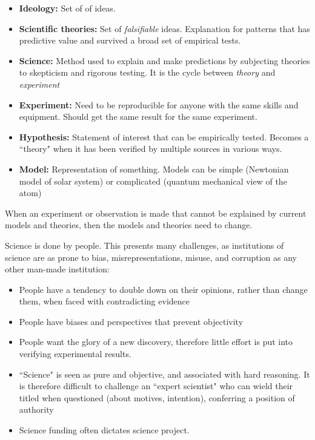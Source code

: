 \documentclass[12pt]{article}
\begin{document}
\begin{itemize}
\item \textbf{Ideology:} Set of of ideas.
\item \textbf{Scientific theories:} Set of \textit{falsifiable} ideas. Explanation for patterns that has predictive value and survived a broad set of empirical tests.
\item \textbf{Science:} Method used to explain and make predictions by subjecting theories to skepticism and rigorous testing. It is the cycle between \textit{theory} and \textit{experiment}
\item \textbf{Experiment:} Need to be reproducible for anyone with the same skills and equipment. Should get the same result for the same experiment.
\item \textbf{Hypothesis:} Statement of interest that can be empirically tested. Becomes a ``theory" when it has been verified by multiple sources in various ways.
\item \textbf{Model:} Representation of something. Models can be simple (Newtonian model of solar system) or complicated (quantum mechanical view of the atom)
\end{itemize}

When an experiment or observation is made that cannot be explained by current models and theories, then the models and theories need to change.

Science is done by people. This presents many challenges, as institutions of science are as prone to bias, misrepresentations, misuse, and corruption as any other man-made institution:
\begin{itemize}
\item People have a tendency to double down on their opinions, rather than change them, when faced with contradicting evidence
\item People have biases and perspectives that prevent objectivity
\item People want the glory of a new discovery, therefore little effort is put into verifying experimental results.
\item ``Science" is seen as pure and objective, and associated with hard reasoning. It is therefore difficult to challenge an ``expert scientist" who can wield their titled when questioned (about motives, intention), conferring a position of authority
\item Science funding often dictates science project.
\end{itemize}
\end{document}
